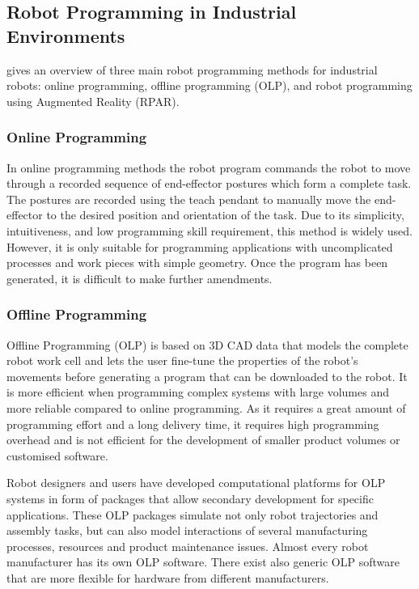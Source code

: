 \subsection{Robot Programming in Industrial Environments}\label{subsec:RP in Industrial Enviroments}
\cite{pan2012recent} gives an overview of three main robot programming methods for industrial robots: online programming, offline programming (OLP), and robot programming using Augmented Reality (RPAR). 

\subsubsection{Online Programming}\label{sssec:Online Programming}
In online programming methods the robot program commands the robot to move through a recorded sequence of end-effector postures which form a complete task. The postures are recorded using the teach pendant to manually move the end-effector to the desired position and orientation of the task. Due to its simplicity, intuitiveness, and low programming skill requirement, this method is widely used. However, it is only suitable for programming applications with uncomplicated processes and work pieces with simple geometry. Once the program has been generated, it is difficult to make further amendments.

\subsubsection{Offline Programming}\label{sssec:Offline Programming}
Offline Programming (OLP) is based on 3D CAD data that models the complete robot work cell and lets the user fine-tune the properties of the robot's movements before generating a program that can be downloaded to the robot. It is more efficient when programming complex systems with large volumes and more reliable compared to online programming. As it requires a great amount of programming effort and a long delivery time, it requires high programming overhead and is not efficient for the development of smaller product volumes or customised software.

Robot designers and users have developed computational platforms for OLP systems in form of packages that allow secondary development for specific applications. These OLP packages simulate not only robot trajectories and assembly tasks, but can also model interactions of several manufacturing processes, resources and product maintenance issues. Almost every robot manufacturer has its own OLP software. There exist also generic OLP software that are more flexible for hardware from different manufacturers.

